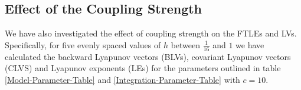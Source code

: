 \subsection{Effect of the Coupling Strength} \label{section:h-effect}

We have also investigated the effect of coupling strength on the FTLEs and LVs. Specifically, for five evenly spaced values of $h$ between $\frac{1}{16}$ and $1$ we have calculated the backward Lyapunov vectors (BLVs), covariant Lyapunov vectors (CLVS) and Lyapunov exponents (LEs) for the parameters outlined in table \ref{Model-Parameter-Table} and \ref{Integration-Parameter-Table} with $c=10$.





